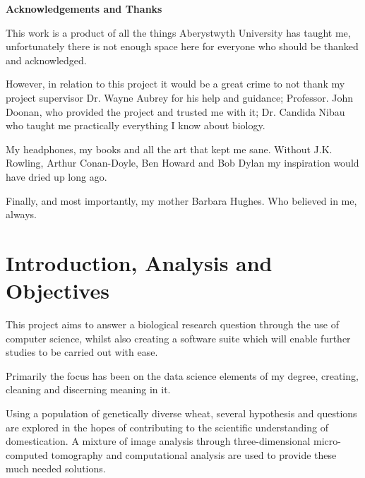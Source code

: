 \documentclass[11pt]{report}
\begin{document}
  \clearpage

  \thispagestyle{plain}

  \begin{center}
    {\LARGE\bf Acknowledgements and Thanks}
  \end{center}

\vspace{3cm}

This work is a product of all the things Aberystwyth University has taught me, unfortunately
there is not enough space here for everyone who should be thanked and acknowledged.

\vspace{1cm}

However, in relation to this project it would be a great crime to not thank my project supervisor Dr. Wayne Aubrey for his help and guidance;
Professor. John Doonan, who provided the project and trusted me with it;
Dr. Candida Nibau who taught me practically everything I know about biology.

\vspace{1cm}

My headphones, my books and all the art that kept me sane. Without J.K. Rowling, Arthur Conan-Doyle, Ben Howard and Bob Dylan
 my inspiration would have dried up long ago.

\vspace{1cm}

Finally, and most importantly, my mother Barbara Hughes. Who believed in me, always.



  \clearpage
  \tableofcontents
  \listoftables
  \listoffigures
  \listoflistings
  \clearpage


\chapter{Introduction, Analysis and Objectives}
\label{sec:orgc4b41ff}

This project aims to answer a biological research question through the use of computer science, whilst also creating a software suite which will enable further studies to be carried out with ease.

Primarily the focus has been on the data science elements of my degree, creating, cleaning and discerning meaning in it.

Using a population of genetically diverse wheat, several hypothesis and questions are explored in the hopes of contributing to the scientific understanding of domestication. A mixture of image analysis through three-dimensional micro-computed tomography and computational analysis are used to provide these much needed solutions.
\end{document}
